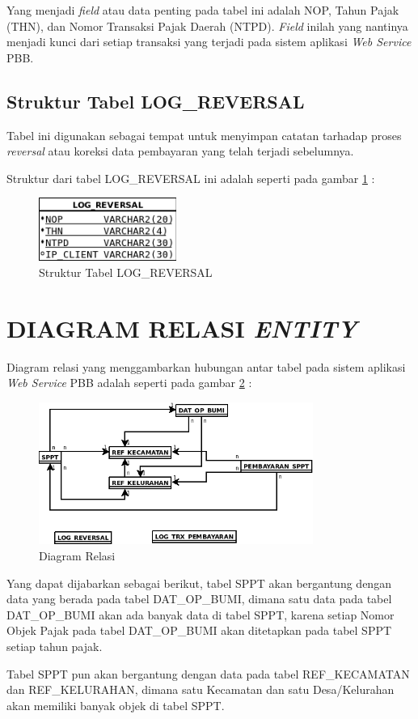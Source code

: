 \documentclass[pdftex,12pt, oneside]{article}
\begin{document}
Yang menjadi \textit{field} atau data penting pada tabel ini adalah NOP, Tahun Pajak (THN), dan Nomor Transaksi Pajak Daerah (NTPD). \textit{Field} inilah yang nantinya menjadi kunci dari setiap transaksi yang terjadi pada sistem aplikasi \textit{Web Service} PBB.


\subsection{Struktur Tabel LOG\_REVERSAL}

Tabel ini digunakan sebagai tempat untuk menyimpan catatan tarhadap proses \textit{reversal} atau koreksi data pembayaran yang telah terjadi sebelumnya.

Struktur dari tabel LOG\_REVERSAL ini adalah seperti pada gambar \ref{fig:tabel-log-reversal} :

\begin{figure}[H]
	\centering
	\includegraphics[width=0.4\textwidth]{./resources/07-struktur-tabel-log-reversal}
	\caption{Struktur Tabel LOG\_REVERSAL}
	\label{fig:tabel-log-reversal}
\end{figure}


\section{DIAGRAM RELASI \textit{ENTITY}}

Diagram relasi yang menggambarkan hubungan antar tabel pada sistem aplikasi \textit{Web Service} PBB adalah seperti pada gambar \ref{fig:relasi-entity} :

\begin{figure}[H]
	\centering
	\includegraphics[width=0.8\textwidth]{./resources/08-relasi-entity}
	\caption{Diagram Relasi}
	\label{fig:relasi-entity}
\end{figure}

Yang dapat dijabarkan sebagai berikut, tabel SPPT akan bergantung dengan data yang berada pada tabel DAT\_OP\_BUMI, dimana satu data pada tabel DAT\_OP\_BUMI akan ada banyak data di tabel SPPT, karena setiap Nomor Objek Pajak pada tabel DAT\_OP\_BUMI akan ditetapkan pada tabel SPPT setiap tahun pajak.

Tabel SPPT pun akan bergantung dengan data pada tabel REF\_KECAMATAN dan REF\_KELURAHAN, dimana satu Kecamatan dan satu Desa/Kelurahan akan memiliki banyak objek di tabel SPPT. 
\end{document}
